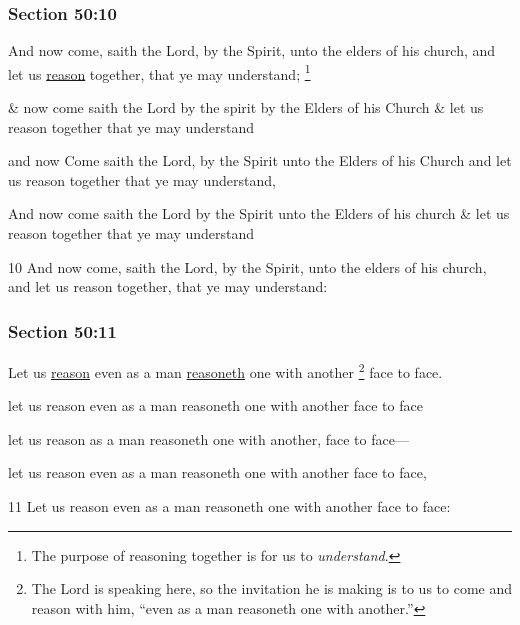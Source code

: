 	\subsubsection{Section 50:10} %
		\label{DC50-10}

		And now come, saith the Lord, by the Spirit, unto the elders of his church, and let us \hyperref[REASON]{reason} together, that ye may understand;%
			\footnote{%
				The purpose of reasoning together is for us to \textit{understand}.
				}

		\begin{framed}
		\scriptsize
			\begin{compactdesc}
				\item[JSP] \& now come saith the Lord by the spirit by the Elders of his Church \& let us reason together that ye may understand
				\item[Gilbert] and now Come saith the Lord, by the Spirit unto the Elders of his Church and let us reason together that ye may understand,
				\item[Hyde and Smith] And now come saith the Lord by the Spirit unto the Elders of his church \& let us reason together that ye may understand
				\item[BC] 10 And now come, saith the Lord, by the Spirit, unto the elders of his church, and let us reason together, that ye may understand:
			\end{compactdesc}
		\end{framed}

	\subsubsection{Section 50:11} %
		\label{DC50-11}

		Let us \hyperref[REASON]{reason} even as a man \hyperref[REASON]{reasoneth} one with another%
			\footnote{%
				The Lord is speaking here, so the invitation he is making is to us to come and reason with him, ``even as a man reasoneth one with another.''
				}
		face to face.

		\begin{framed}
		\scriptsize
			\begin{compactdesc}
				\item[JSP] let us reason even as a man reasoneth one with another face to face
				\item[Gilbert] let us reason as a man reasoneth one with another, face to face---
				\item[Hyde and Smith] let us reason even as a man reasoneth one with another face to face,
				\item[BC] 11 Let us reason even as a man reasoneth one with another face to face:
			\end{compactdesc}
		\end{framed}

